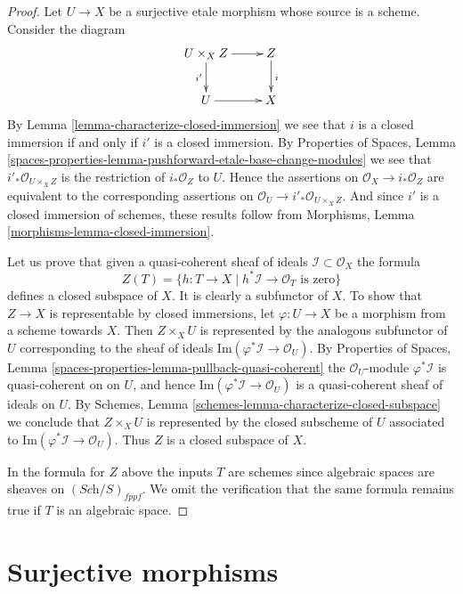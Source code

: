 \begin{proof}
Let $U \to X$ be a surjective etale morphism whose source is a scheme.
Consider the diagram
$$
\xymatrix{
U \times_X Z \ar[r] \ar[d]_{i'} & Z \ar[d]^i \\
U \ar[r] & X
}
$$
By
Lemma \ref{lemma-characterize-closed-immersion}
we see that $i$ is a closed immersion
if and only if $i'$ is a closed immersion. By
Properties of Spaces,
Lemma \ref{spaces-properties-lemma-pushforward-etale-base-change-modules}
we see that $i'_*\mathcal{O}_{U \times_X Z}$ is the restriction of
$i_*\mathcal{O}_Z$ to $U$. Hence the assertions on
$\mathcal{O}_X \to i_*\mathcal{O}_Z$ are equivalent to the
corresponding assertions on
$\mathcal{O}_U \to i'_*\mathcal{O}_{U \times_X Z}$.
And since $i'$ is a closed immersion of schemes, these results follow from
Morphisms, Lemma \ref{morphisms-lemma-closed-immersion}.

\medskip\noindent
Let us prove that given a quasi-coherent
sheaf of ideals $\mathcal{I} \subset \mathcal{O}_X$ the formula
$$
Z(T) = \{h : T \to X \mid h^*\mathcal{I} \to \mathcal{O}_T
\text{ is zero}\}
$$
defines a closed subspace of $X$. It is clearly a subfunctor of $X$.
To show that $Z \to X$ is representable by closed immersions, let
$\varphi : U \to X$ be a morphism from a scheme towards $X$. Then
$Z \times_X U$ is represented by the analogous subfunctor of $U$ corresponding
to the sheaf of ideals $\text{Im}(\varphi^*\mathcal{I} \to \mathcal{O}_U)$. By
Properties of Spaces,
Lemma \ref{spaces-properties-lemma-pullback-quasi-coherent}
the $\mathcal{O}_U$-module $\varphi^*\mathcal{I}$ is quasi-coherent on
on $U$, and hence $\text{Im}(\varphi^*\mathcal{I} \to \mathcal{O}_U)$
is a quasi-coherent sheaf of ideals on $U$. By
Schemes, Lemma \ref{schemes-lemma-characterize-closed-subspace}
we conclude that $Z \times_X U$ is represented by the closed subscheme
of $U$ associated to $\text{Im}(\varphi^*\mathcal{I} \to \mathcal{O}_U)$.
Thus $Z$ is a closed subspace of $X$.

\medskip\noindent
In the formula for $Z$ above the inputs $T$ are schemes since algebraic
spaces are sheaves on $(\textit{Sch}/S)_{fppf}$. We omit the verification
that the same formula remains true if $T$ is an algebraic space.
\end{proof}












\section{Surjective morphisms}
\label{section-surjective}

